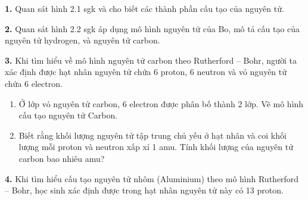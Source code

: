 \documentclass[11pt,a4paper]{article}
\begin{document}
\textbf{1.} Quan sát hình 2.1 sgk và cho biết các thành phần cấu tạo của nguyên tử.
\par\vspace{1pt}\noindent\dotfill\par\vspace{3pt}\noindent\dotfill\par\vspace{3pt}\noindent\dotfill\par\vspace{3pt}\noindent
\textbf{2.} Quan sát hình 2.2 sgk áp dụng mô hình nguyên tử của Bo, mô tả cấu tạo của nguyên tử hydrogen, và nguyên tử carbon.
\par\vspace{1pt}\noindent\dotfill\par\vspace{3pt}\noindent\dotfill\par\vspace{3pt}\noindent\dotfill\par\vspace{3pt}\noindent\dotfill\par\vspace{3pt}\noindent
\textbf{3.} Khi tìm hiểu về mô hình nguyên tử carbon theo Rutherford – Bohr, người ta xác định được hạt nhân nguyên tử chứa 6 proton, 6 neutron và vỏ nguyên tử chứa 6 electron.
\begin{enumerate}[label=\alph*.,leftmargin=1.5cm,itemsep=1pt]
  \item Ở lớp vỏ nguyên tử carbon, 6 electron được phân bố thành 2 lớp. Vẽ mô hình cấu tạo nguyên tử Carbon.
  \item Biết rằng khối lượng nguyên tử tập trung chủ yếu ở hạt nhân và coi khối lượng mỗi proton và neutron xấp xỉ 1 amu. Tính khối lượng của nguyên tử carbon bao nhiêu amu?
\end{enumerate}
\par\vspace{1pt}\noindent\dotfill\par\vspace{3pt}\noindent\dotfill\par\vspace{3pt}\noindent\dotfill\par\vspace{3pt}\noindent\dotfill\par\vspace{3pt}\noindent\dotfill\par\vspace{3pt}\noindent
\textbf{4.} Khi tìm hiểu cấu tạo nguyên tử nhôm (Aluminium) theo mô hình Rutherford – Bohr, học sinh xác định được trong hạt nhân nguyên tử này có 13 proton.
\end{document}
